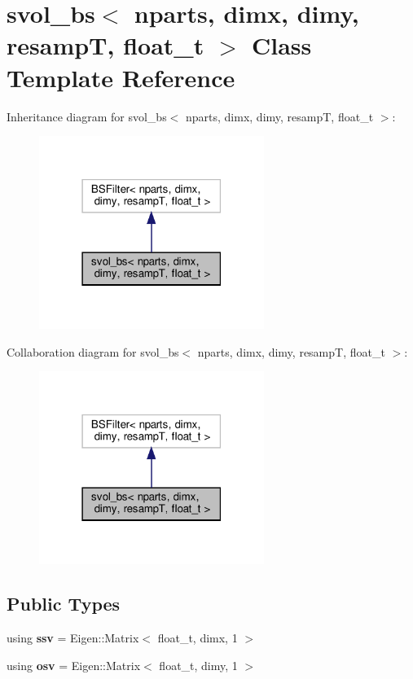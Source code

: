 \hypertarget{classsvol__bs}{}\section{svol\+\_\+bs$<$ nparts, dimx, dimy, resampT, float\+\_\+t $>$ Class Template Reference}
\label{classsvol__bs}


Inheritance diagram for svol\+\_\+bs$<$ nparts, dimx, dimy, resampT, float\+\_\+t $>$\+:\nopagebreak
\begin{figure}[H]
\begin{center}
\leavevmode
\includegraphics[width=207pt]{classsvol__bs__inherit__graph}
\end{center}
\end{figure}


Collaboration diagram for svol\+\_\+bs$<$ nparts, dimx, dimy, resampT, float\+\_\+t $>$\+:\nopagebreak
\begin{figure}[H]
\begin{center}
\leavevmode
\includegraphics[width=207pt]{classsvol__bs__coll__graph}
\end{center}
\end{figure}
\subsection*{Public Types}
\begin{DoxyCompactItemize}
\item 
\mbox{\label{classsvol__bs_a8ef6370aa347e276147b393786a7ecd5}} 
using {\bfseries ssv} = Eigen\+::\+Matrix$<$ float\+\_\+t, dimx, 1 $>$
\item 
\mbox{\label{classsvol__bs_a90e38a1fae511361b0ac017b0c5c80a0}} 
using {\bfseries osv} = Eigen\+::\+Matrix$<$ float\+\_\+t, dimy, 1 $>$
\end{DoxyCompactItemize}
